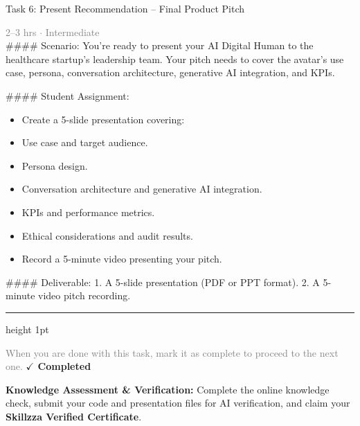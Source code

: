 \documentclass[10pt,a4paper]{article}
\begin{document}
\begin{taskbox}{Task 6: Present Recommendation – Final Product Pitch}

    {\small \textcolor{gray}{2--3 hrs $\cdot$ Intermediate}}\\[12pt]

    \#\#\#\# Scenario:  
You’re ready to present your AI Digital Human to the healthcare startup’s leadership team. Your pitch needs to cover the avatar’s use case, persona, conversation architecture, generative AI integration, and KPIs.  

\#\#\#\# Student Assignment:  
\begin{itemize}
    \item Create a 5-slide presentation covering:  
    \item Use case and target audience.  
    \item Persona design.  
    \item Conversation architecture and generative AI integration.  
    \item KPIs and performance metrics.  
    \item Ethical considerations and audit results.  
    \item Record a 5-minute video presenting your pitch.  
\end{itemize}

\#\#\#\# Deliverable:  
1. A 5-slide presentation (PDF or PPT format).  
2. A 5-minute video pitch recording.\par

    \vspace{16pt}

    \textcolor{cardBorder}{\hrule height 1pt}\vspace{8pt}

    \small \textcolor{gray}{When you are done with this task, mark it as complete to proceed to the next one.} \hfill \textbf{\textcolor{brandDark}{$\checkmark$ Completed}}

\end{taskbox}

\begin{completionbox}
    \textbf{Knowledge Assessment \& Verification:} Complete the online knowledge check, submit your code and presentation files for AI verification, and claim your \textbf{Skillzza Verified Certificate}.
\end{completionbox}

\newpage

\end{document}
